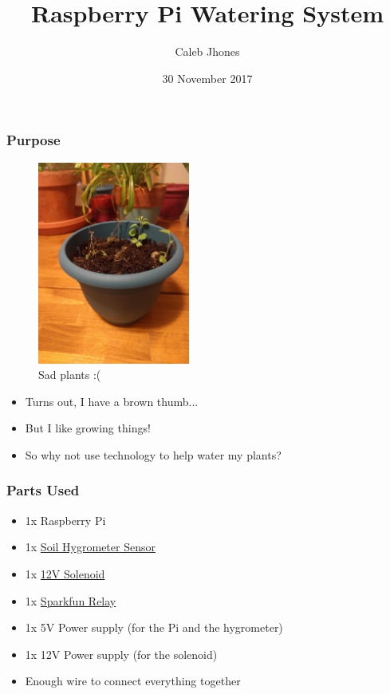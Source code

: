 \documentclass{beamer}
\title{Raspberry Pi Watering System}
\author{Caleb Jhones}
\date{30 November 2017}
\institute{CSCI 250}
\begin{document}
\begin{frame}
    \maketitle
\end{frame}

\begin{frame}
    \frametitle{Purpose}
    \begin{minipage}{0.45\textwidth}
        \begin{figure}
            \includegraphics[width=5cm]{../img/sad-plants}
            \caption{Sad plants :(}
        \end{figure}
    \end{minipage}%
    \begin{minipage}{0.55\textwidth}
        \begin{itemize}
            \item Turns out, I have a brown thumb...
            \pause
            \item But I like growing things!
            \pause
            \item So why not use technology to help water my plants?
        \end{itemize}
    \end{minipage}%
\end{frame}

\begin{frame}
    \frametitle{Parts Used}
    \begin{itemize}
        \item 1x Raspberry Pi
        \item 1x \href{https://www.amazon.com/gp/product/B01FDGUHBM}{Soil Hygrometer Sensor}
        \item 1x \href{https://www.sparkfun.com/products/10456}{12V Solenoid}
        \item 1x \href{https://www.sparkfun.com/products/13815}{Sparkfun Relay}
        \item 1x 5V Power supply (for the Pi and the hygrometer)
        \item 1x 12V Power supply (for the solenoid)
        \item Enough wire to connect everything together
    \end{itemize}
\end{frame}
\end{document}
